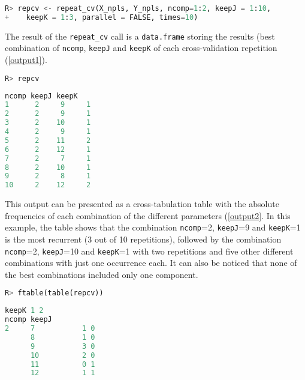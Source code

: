 \vspace{15pt}
\begin{lstlisting}[basicstyle=\small, language=Python, deletekeywords={max, scale}, morekeywords={array, matrix, rep, rpois, rnorm, function, repeat_cv}, otherkeywords={}]
R> repcv <- repeat_cv(X_npls, Y_npls, ncomp=1:2, keepJ = 1:10, 
+    keepK = 1:3, parallel = FALSE, times=10)
\end{lstlisting}

The result of the \texttt{repeat\_cv} call is a \texttt{data.frame} storing the results (best combination of \texttt{ncomp}, \texttt{keepJ} and \texttt{keepK} of each cross-validation repetition (\autoref{output1}). 

\vspace{15pt}
\begin{lstlisting}[basicstyle=\small, language=Python]
R> repcv
\end{lstlisting}

\vspace{5pt}
\begin{lstlisting}[basicstyle=\small, backgroundcolor=\color{output}, numbers=none, label={output1}, language=Python, caption=Results of \texttt{repeat\_cv} function.]
   ncomp keepJ keepK
1      2     9     1
2      2     9     1
3      2    10     1
4      2     9     1
5      2    11     2
6      2    12     1
7      2     7     1
8      2    10     1
9      2     8     1
10     2    12     2
\end{lstlisting}

This output can be presented as a cross-tabulation table with the absolute frequencies of each combination of the different parameters (\autoref{output2}. In this example, the table shows that the combination \texttt{ncomp}=2, \texttt{keepJ}=9 and \texttt{keepK}=1 is the most recurrent (3 out of 10 repetitions), followed by the combination \texttt{ncomp}=2, \texttt{keepJ}=10 and \texttt{keepK}=1 with two repetitions and five other different combinations with just one occurrence each. It can also be noticed that none of the best combinations included only one component.

\vspace{15pt}
\begin{lstlisting}[basicstyle=\small, language=Python, deletekeywords={max, scale}, morekeywords={ftable, table}, otherkeywords={}]
R> ftable(table(repcv))
\end{lstlisting}

\begin{lstlisting}[basicstyle=\small, backgroundcolor=\color{output}, numbers=none, label={output2}, language=Python, caption=Cross-tabulation table of the results of \texttt{repeat\_cv}.]
            keepK 1 2
ncomp keepJ          
2     7           1 0
      8           1 0
      9           3 0
      10          2 0
      11          0 1
      12          1 1
\end{lstlisting}

